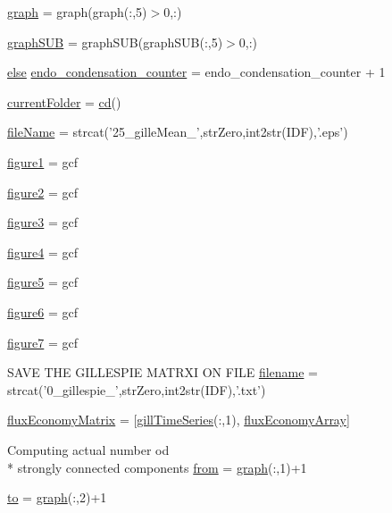 \begin{DoxyCompactItemize}
\item 
\hyperlink{a00028_a91819eaefb434ac459f17b3caa03713d}{graph} = graph(graph(\-:,5)$>$0,\-:)
\item 
\hyperlink{a00028_a0c738fa68cf19f3aeef6b6a7a723577c}{graph\-S\-U\-B} = graph\-S\-U\-B(graph\-S\-U\-B(\-:,5)$>$0,\-:)
\item 
\hyperlink{a00031_af5946383720aa572eb93e1e63afc23c2}{else} \hyperlink{a00028_ac7610da79e174cac91899b5a15014265}{endo\-\_\-condensation\-\_\-counter} = endo\-\_\-condensation\-\_\-counter + 1
\item 
\hyperlink{a00028_af393966a41271e721a03e544a1650f4a}{current\-Folder} = \hyperlink{a00068_a767271ad82d244871370a0f0e6a7f8a4}{cd}()
\item 
\hyperlink{a00028_acbece2625a541230e9f9091adca38c8c}{file\-Name} = strcat('25\-\_\-gille\-Mean\-\_\-',str\-Zero,int2str(\-I\-D\-F),'.\-eps')
\item 
\hyperlink{a00028_aa04641698301ef27b9562e1a03d697cf}{figure1} = gcf
\item 
\hyperlink{a00028_a185ece7ea03635f3e9f36bce457bc6b0}{figure2} = gcf
\item 
\hyperlink{a00028_a49c05716a1aa25ef47e7b2a3cc3b7362}{figure3} = gcf
\item 
\hyperlink{a00028_a3910d94d7f9d81634d5102442e25d603}{figure4} = gcf
\item 
\hyperlink{a00028_aacba0a23b9337f688d1a0fc707f49bb8}{figure5} = gcf
\item 
\hyperlink{a00028_a6d1dba2624229e06f705f5eaa6e11a9b}{figure6} = gcf
\item 
\hyperlink{a00028_ad893b16e514321b512ee5c11fb5b7b0d}{figure7} = gcf
\item 
S\-A\-V\-E T\-H\-E G\-I\-L\-L\-E\-S\-P\-I\-E M\-A\-T\-R\-X\-I O\-N F\-I\-L\-E \hyperlink{a00028_a3982f974d3baf0c73223616526999bed}{filename} = strcat('0\-\_\-gillespie\-\_\-',str\-Zero,int2str(\-I\-D\-F),'.\-txt')
\item 
\hyperlink{a00028_a0f649e90f057db90356bf42a61b618b3}{flux\-Economy\-Matrix} = \mbox{[}\hyperlink{a00028_ac62d9b6e4b7257c90322e20e1eb8e733}{gill\-Time\-Series}(\-:,1), \hyperlink{a00028_a5d3cba9db002e77eaf6ffce66592841f}{flux\-Economy\-Array}\mbox{]}
\item 
Computing actual number od \\*
strongly connected components \hyperlink{a00028_aa7b4fe13e75a69fca72862effeaf6196}{from} = \hyperlink{a00028_a2745e24fec2a44d51f4452beb1596bd3}{graph}(\-:,1)+1
\item 
\hyperlink{a00028_af71dbe52628a3f83a77ab494817525c6}{to} = \hyperlink{a00028_a2745e24fec2a44d51f4452beb1596bd3}{graph}(\-:,2)+1

\end{DoxyCompactItemize}
